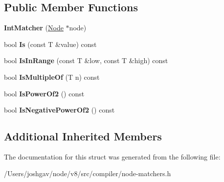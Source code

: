 \subsection*{Public Member Functions}
\begin{DoxyCompactItemize}
\item 
{\bfseries Int\+Matcher} (\hyperlink{classv8_1_1internal_1_1compiler_1_1_node}{Node} $\ast$node)\hypertarget{structv8_1_1internal_1_1compiler_1_1_int_matcher_aa7ebd3eb2f63cebf51ead500730cc723}{}\label{structv8_1_1internal_1_1compiler_1_1_int_matcher_aa7ebd3eb2f63cebf51ead500730cc723}

\item 
bool {\bfseries Is} (const T \&value) const \hypertarget{structv8_1_1internal_1_1compiler_1_1_int_matcher_a378a9e71baebd2938300f66024ae966c}{}\label{structv8_1_1internal_1_1compiler_1_1_int_matcher_a378a9e71baebd2938300f66024ae966c}

\item 
bool {\bfseries Is\+In\+Range} (const T \&low, const T \&high) const \hypertarget{structv8_1_1internal_1_1compiler_1_1_int_matcher_a995d95979df7886634da01ef0c62fa27}{}\label{structv8_1_1internal_1_1compiler_1_1_int_matcher_a995d95979df7886634da01ef0c62fa27}

\item 
bool {\bfseries Is\+Multiple\+Of} (T n) const \hypertarget{structv8_1_1internal_1_1compiler_1_1_int_matcher_ac31848789573ae1aad63d6702e154ae5}{}\label{structv8_1_1internal_1_1compiler_1_1_int_matcher_ac31848789573ae1aad63d6702e154ae5}

\item 
bool {\bfseries Is\+Power\+Of2} () const \hypertarget{structv8_1_1internal_1_1compiler_1_1_int_matcher_a3b34e26ad117b24d832af20d2b765961}{}\label{structv8_1_1internal_1_1compiler_1_1_int_matcher_a3b34e26ad117b24d832af20d2b765961}

\item 
bool {\bfseries Is\+Negative\+Power\+Of2} () const \hypertarget{structv8_1_1internal_1_1compiler_1_1_int_matcher_ad1c1c0aa76d1e57257bb1887387b0cbd}{}\label{structv8_1_1internal_1_1compiler_1_1_int_matcher_ad1c1c0aa76d1e57257bb1887387b0cbd}

\end{DoxyCompactItemize}
\subsection*{Additional Inherited Members}


The documentation for this struct was generated from the following file\+:\begin{DoxyCompactItemize}
\item 
/\+Users/joshgav/node/v8/src/compiler/node-\/matchers.\+h\end{DoxyCompactItemize}
